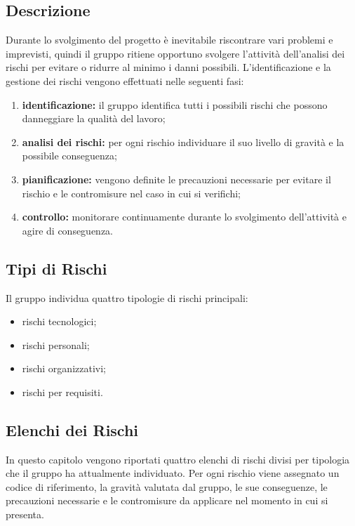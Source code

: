 \subsection{Descrizione}
Durante lo svolgimento del progetto è inevitabile riscontrare vari problemi e imprevisti, quindi il gruppo ritiene opportuno svolgere l’attività dell’analisi dei rischi per evitare o ridurre al minimo i danni possibili.\newline
L’identificazione e la gestione dei rischi vengono effettuati nelle seguenti fasi:
\begin{enumerate}
\item \textbf{identificazione:}  il gruppo identifica tutti i possibili rischi che possono danneggiare la qualità del lavoro;
\item \textbf{analisi dei rischi:} per ogni rischio individuare il suo livello di gravità e la possibile conseguenza;
\item \textbf{pianificazione:} vengono definite le precauzioni necessarie per evitare il rischio e le contromisure nel caso in cui si verifichi;
\item \textbf{controllo:} monitorare continuamente durante lo svolgimento dell’attività e agire di conseguenza.
\end{enumerate}

\subsection{Tipi di Rischi}
Il gruppo individua quattro tipologie di rischi principali:
\begin{itemize}
\item rischi tecnologici;
\item rischi personali;
\item rischi organizzativi;
\item rischi per requisiti.
\end{itemize}

\subsection{Elenchi dei Rischi}
In questo capitolo vengono riportati quattro elenchi di rischi divisi per tipologia che il gruppo ha attualmente individuato.
Per ogni rischio viene assegnato un codice di riferimento, la gravità valutata dal gruppo, le sue conseguenze, le precauzioni necessarie e le contromisure da applicare nel momento in cui si presenta. 
